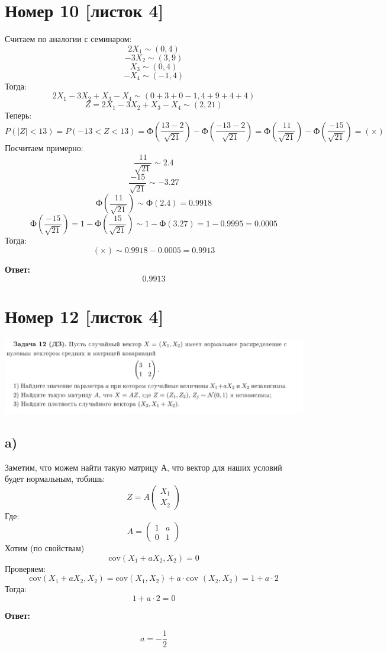 \documentclass[a4paper,12pt]{article}
\author{Бурмашев Григорий, БПМИ-208}
\title{}
\date{\today}
\begin{document}
\maketitle
\section*{Номер 10 [листок 4]}
Считаем по аналогии с семинаром:
\[
2X_1 \sim (0, 4) 
\]
\[
-3X_2 \sim (3, 9) 
\]
\[
X_3 \sim (0, 4) 
\]
\[
-X_4 \sim (-1, 4)
\]
Тогда:
\[
2X_1 - 3X_2 + X_3 - X_4 \sim (0 + 3+ 0 - 1, 4 + 9 + 4 + 4)
\]
\[
Z = 2X_1 - 3X_2 + X_3 - X_4 \sim (2, 21)
\]
Теперь:
\[
P(|Z| < 13) = P(-13 < Z < 13) = \text{Ф} \left(
\frac{13 - 2}{\sqrt{21}}
\right) - 
 \text{Ф} \left(
\frac{-13 - 2}{\sqrt{21}}
\right)  = \text{Ф} \left(
\frac{11}{\sqrt{21}}
\right) - 
 \text{Ф} \left(
\frac{-15}{\sqrt{21}}
\right)  = (\times)
\]
Посчитаем примерно:
\[
\frac{11}{\sqrt{21}} \sim  2.4 
\]
\[
\frac{-15}{\sqrt{21}} \sim -3.27
\]
\[
 \text{Ф} \left(
\frac{11}{\sqrt{21}}
\right) \sim  \text{Ф} \left(
2.4
\right) = 0.9918
\]
\[
 \text{Ф} \left(
\frac{-15}{\sqrt{21}}
\right)  =  1 - \text{Ф} \left(
\frac{15}{\sqrt{21}}
\right)  \sim 1 - \text{Ф} \left(
3.27
\right) = 1 - 0.9995 = 0.0005
\]
Тогда:
\[
(\times) \sim 0.9918 - 0.0005 = 0.9913
\]
\begin{center}
\textbf{Ответ: } 
\[
0.9913
\]
\end{center}
\clearpage
\section*{Номер 12 [листок 4]}
\begin{center}
\includegraphics[scale=0.2]{1.png}
\end{center}
\subsection*{a)}
Заметим, что можем найти такую матрицу А, что вектор для наших условий будет нормальным, тобишь:
\[
Z = 
A \begin{pmatrix}
X_1 \\ X_2
\end{pmatrix}
\]
Где:
\[
A = \begin{pmatrix}
1 & a \\ 0 & 1
\end{pmatrix}
\]
Хотим (по свойствам)
\[
\text{cov} (X_1 + aX_2, X_2) = 0 
\]
Проверяем:
\[
\text{cov} (X_1 + aX_2, X_2) = \text{cov}  (X_1, X_2) + a \cdot  \text{cov }(X_2, X_2) = 1 + a \cdot 2
\]
Тогда:
\[
1 + a \cdot 2= 0
\]
\begin{center}
\textbf{Ответ: } 
\end{center}
\[
a = - \frac{1}{2}
\]
\end{document}
